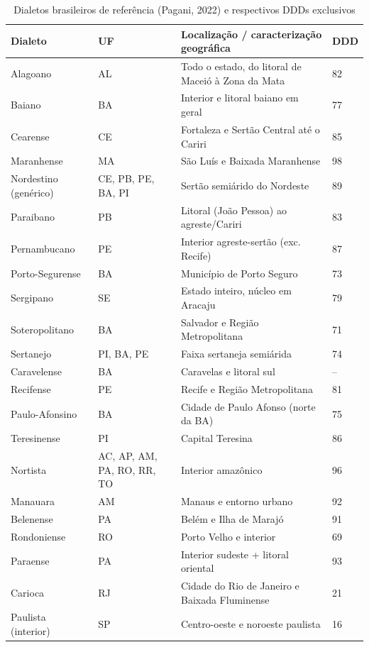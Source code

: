 \begin{table}[htbp]
	\centering
	\scriptsize
	\caption{Dialetos brasileiros de referência (Pagani, 2022) e respectivos DDDs exclusivos}
	\label{tab:dialetos_ddd}
	\begin{tabular}{p{3.3cm} p{1.1cm} p{7.7cm} p{0.9cm}}
		\toprule
		\textbf{Dialeto} & \textbf{UF} & \textbf{Localização / caracterização geográfica} & \textbf{DDD}\\
		\midrule
		Alagoano & AL & Todo o estado, do litoral de Maceió à Zona da Mata & 82\\
		Baiano & BA & Interior e litoral baiano em geral & 77\\
		Cearense & CE & Fortaleza e Sertão Central até o Cariri & 85\\
		Maranhense & MA & São Luís e Baixada Maranhense & 98\\
		Nordestino (genérico) & CE, PB, PE, BA, PI & Sertão semiárido do Nordeste & 89\\
		Paraibano & PB & Litoral (João Pessoa) ao agreste/Cariri & 83\\
		Pernambucano & PE & Interior agreste-sertão (exc. Recife) & 87\\
		Porto-Segurense & BA & Município de Porto Seguro & 73\\
		Sergipano & SE & Estado inteiro, núcleo em Aracaju & 79\\
		Soteropolitano & BA & Salvador e Região Metropolitana & 71\\
		Sertanejo & PI, BA, PE & Faixa sertaneja semiárida & 74\\
		Caravelense & BA & Caravelas e litoral sul & --\\
		Recifense & PE & Recife e Região Metropolitana & 81\\
		Paulo-Afonsino & BA & Cidade de Paulo Afonso (norte da BA) & 75\\
		Teresinense & PI & Capital Teresina & 86\\
		Nortista & AC, AP, AM, PA, RO, RR, TO & Interior amazônico & 96\\
		Manauara & AM & Manaus e entorno urbano & 92\\
		Belenense & PA & Belém e Ilha de Marajó & 91\\
		Rondoniense & RO & Porto Velho e interior & 69\\
		Paraense & PA & Interior sudeste + litoral oriental & 93\\
		Carioca & RJ & Cidade do Rio de Janeiro e Baixada Fluminense & 21\\
		Paulista (interior) & SP & Centro-oeste e noroeste paulista & 16\\

\end{tabular}
\end{table}
